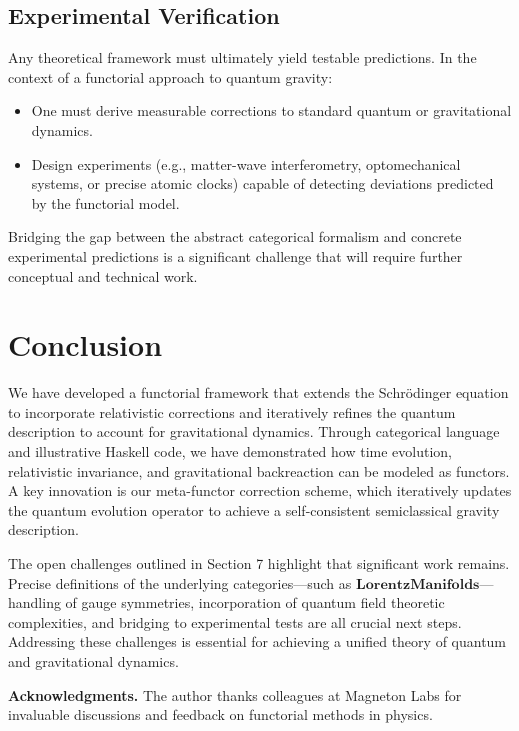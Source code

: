 \documentclass[12pt]{article}
\begin{document}
\subsection{Experimental Verification}
Any theoretical framework must ultimately yield testable predictions. In the context of a functorial approach to quantum gravity:
\begin{itemize}
    \item One must derive measurable corrections to standard quantum or gravitational dynamics.
    \item Design experiments (e.g., matter-wave interferometry, optomechanical systems, or precise atomic clocks) capable of detecting deviations predicted by the functorial model.
\end{itemize}
Bridging the gap between the abstract categorical formalism and concrete experimental predictions is a significant challenge that will require further conceptual and technical work.

\section{Conclusion}
We have developed a functorial framework that extends the Schrödinger equation to incorporate relativistic corrections and iteratively refines the quantum description to account for gravitational dynamics. Through categorical language and illustrative Haskell code, we have demonstrated how time evolution, relativistic invariance, and gravitational backreaction can be modeled as functors. A key innovation is our meta-functor correction scheme, which iteratively updates the quantum evolution operator to achieve a self-consistent semiclassical gravity description.

The open challenges outlined in Section 7 highlight that significant work remains. Precise definitions of the underlying categories—such as \(\mathbf{LorentzManifolds}\)—handling of gauge symmetries, incorporation of quantum field theoretic complexities, and bridging to experimental tests are all crucial next steps. Addressing these challenges is essential for achieving a unified theory of quantum and gravitational dynamics.

\vspace{0.5em}
\noindent\textbf{Acknowledgments.} The author thanks colleagues at Magneton Labs for invaluable discussions and feedback on functorial methods in physics.
\end{document}
